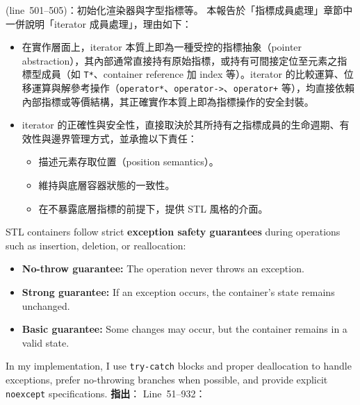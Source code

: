 \documentclass[a4paper,12pt]{article}
\begin{document}
(line~501--505)：初始化渲染器與字型指標等。
\label{2-B-1-2}
本報告於「指標成員處理」章節中一併說明「iterator 成員處理」，理由如下：
\begin{itemize}
\item 在實作層面上，iterator 本質上即為一種受控的指標抽象（pointer abstraction），其內部通常直接持有原始指標，或持有可間接定位至元素之指標型成員（如 \verb|T*|、container reference 加 index 等）。iterator 的比較運算、位移運算與解參考操作（\verb|operator*|、\verb|operator->|、\verb|operator+| 等），均直接依賴內部指標或等價結構，其正確實作本質上即為指標操作的安全封裝。
\item iterator 的正確性與安全性，直接取決於其所持有之指標成員的生命週期、有效性與邊界管理方式，並承擔以下責任：
  \begin{itemize}
  \item 描述元素存取位置（position semantics）。
  \item 維持與底層容器狀態的一致性。
  \item 在不暴露底層指標的前提下，提供 STL 風格的介面。
  \end{itemize}
\end{itemize}
\label{exception}
STL containers follow strict \textbf{exception safety guarantees} during operations such as insertion, deletion, or reallocation:
\begin{itemize}
    \item \textbf{No-throw guarantee:} The operation never throws an exception.
    \item \textbf{Strong guarantee:} If an exception occurs, the container's state remains unchanged.
    \item \textbf{Basic guarantee:} Some changes may occur, but the container remains in a valid state.
\end{itemize}
In my implementation, I use \texttt{try-catch} blocks and proper deallocation to handle exceptions, prefer no-throwing branches when possible, and provide explicit \texttt{noexcept} specifications.
\textbf{指出}：
\label{vector-list}
Line~51--932：
\end{document}

